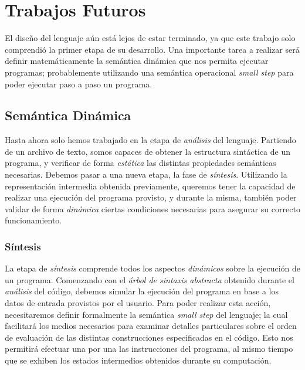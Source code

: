\section{Trabajos Futuros}

El diseño del lenguaje aún está lejos de estar terminado, ya que este trabajo solo comprendió la primer etapa de su desarrollo.
Una importante tarea a realizar será definir matemáticamente la semántica dinámica que nos permita ejecutar programas; probablemente utilizando una semántica operacional \textit{small step} para poder ejecutar paso a paso un programa.

\iffalse
\subsection{Semántica Dinámica}

Hasta ahora solo hemos trabajado en la etapa de \textit{análisis} del lenguaje.
Partiendo de un archivo de texto, somos capaces de obtener la estructura sintáctica de un programa, y verificar de forma \textit{estática} las distintas propiedades semánticas necesarias.
Debemos pasar a una nueva etapa, la fase de \textit{síntesis}.
Utilizando la representación intermedia obtenida previamente, queremos tener la capacidad de realizar una ejecución del programa provisto, y durante la misma, también poder validar de forma \textit{dinámica} ciertas condiciones necesarias para asegurar su correcto funcionamiento.

\subsubsection{Síntesis}

La etapa de \textit{síntesis} comprende todos los aspectos \textit{dinámicos} sobre la ejecución de un programa.
Comenzando con el \textit{árbol de sintaxis abstracta} obtenido durante el \textit{análisis} del código, debemos simular la ejecución del programa en base a los datos de entrada provistos por el usuario.
Para poder realizar esta acción, necesitaremos definir formalmente la semántica \textit{small step} del lenguaje; la cual facilitará los medios necesarios para examinar detalles particulares sobre el orden de evaluación de las distintas construcciones especificadas en el código.
Esto nos permitirá efectuar una por una las instrucciones del programa, al mismo tiempo que se exhiben los estados intermedios obtenidos durante su computación.

